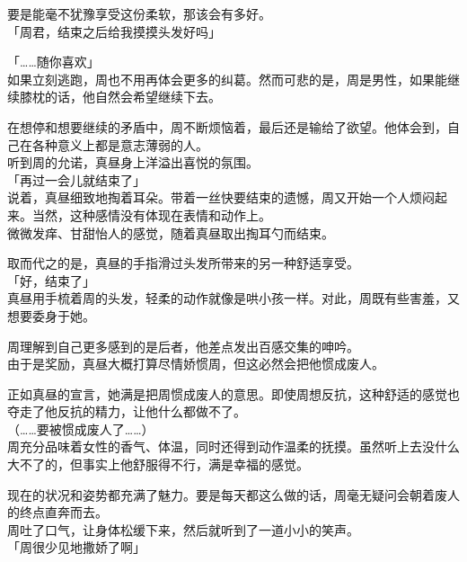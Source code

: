 要是能毫不犹豫享受这份柔软，那该会有多好。\\

「周君，结束之后给我摸摸头发好吗」

「……随你喜欢」\\

如果立刻逃跑，周也不用再体会更多的纠葛。然而可悲的是，周是男性，如果能继续膝枕的话，他自然会希望继续下去。

在想停和想要继续的矛盾中，周不断烦恼着，最后还是输给了欲望。他体会到，自己在各种意义上都是意志薄弱的人。\\

听到周的允诺，真昼身上洋溢出喜悦的氛围。\\

「再过一会儿就结束了」\\

说着，真昼细致地掏着耳朵。带着一丝快要结束的遗憾，周又开始一个人烦闷起来。当然，这种感情没有体现在表情和动作上。\\

微微发痒、甘甜怡人的感觉，随着真昼取出掏耳勺而结束。

取而代之的是，真昼的手指滑过头发所带来的另一种舒适享受。\\

「好，结束了」\\

真昼用手梳着周的头发，轻柔的动作就像是哄小孩一样。对此，周既有些害羞，又想要委身于她。

周理解到自己更多感到的是后者，他差点发出百感交集的呻吟。\\

由于是奖励，真昼大概打算尽情娇惯周，但这必然会把他惯成废人。

正如真昼的宣言，她满是把周惯成废人的意思。即使周想反抗，这种舒适的感觉也夺走了他反抗的精力，让他什么都做不了。\\

（……要被惯成废人了……）\\

周充分品味着女性的香气、体温，同时还得到动作温柔的抚摸。虽然听上去没什么大不了的，但事实上他舒服得不行，满是幸福的感觉。

现在的状况和姿势都充满了魅力。要是每天都这么做的话，周毫无疑问会朝着废人的终点直奔而去。\\

周吐了口气，让身体松缓下来，然后就听到了一道小小的笑声。\\

「周很少见地撒娇了啊」


